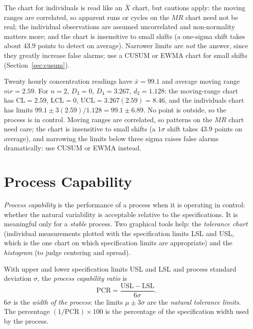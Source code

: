 The chart for individuals is read like an $\bar{X}$ chart, but cautions apply: the moving ranges are correlated, so apparent runs or cycles on the $MR$ chart need not be real; the individual observations are assumed uncorrelated and non-normality matters more; and the chart is insensitive to small shifts (a one-sigma shift takes about $43.9$ points to detect on average). Narrower limits are \emph{not} the answer, since they greatly increase false alarms; use a CUSUM or EWMA chart for small shifts (Section~\ref{sec:cusum}).

\begin{example}
Twenty hourly concentration readings have $\bar{x}=99.1$ and average moving range $\overline{mr}=2.59$. For $n=2$, $D_3=0$, $D_4=3.267$, $d_2=1.128$: the moving-range chart has $\mathrm{CL}=2.59$, $\mathrm{LCL}=0$, $\mathrm{UCL}=3.267(2.59)=8.46$, and the individuals chart has limits $99.1\pm3(2.59)/1.128=99.1\pm6.89$. No point is outside, so the process is in control. Moving ranges are correlated, so patterns on the $MR$ chart need care; the chart is insensitive to small shifts (a $1\sigma$ shift takes $43.9$ points on average), and narrowing the limits below three sigma raises false alarms dramatically: use CUSUM or EWMA instead.
\end{example}

\section{Process Capability}

\emph{Process capability} is the performance of a process when it is operating in control: whether the natural variability is acceptable relative to the specifications. It is meaningful only for a \emph{stable} process. Two graphical tools help: the \emph{tolerance chart} (individual measurements plotted with the specification limits LSL and USL, which is the one chart on which specification limits are appropriate) and the \emph{histogram} (to judge centering and spread).

\begin{definition}
With upper and lower specification limits USL and LSL and process standard deviation $\sigma$, the \emph{process capability ratio} is
\[ \mathrm{PCR}=\frac{\mathrm{USL}-\mathrm{LSL}}{6\sigma}. \]
$6\sigma$ is the \emph{width of the process}: the limits $\mu\pm3\sigma$ are the \emph{natural tolerance limits}. The percentage $(1/\mathrm{PCR})\times100$ is the percentage of the specification width used by the process.
\end{definition}

